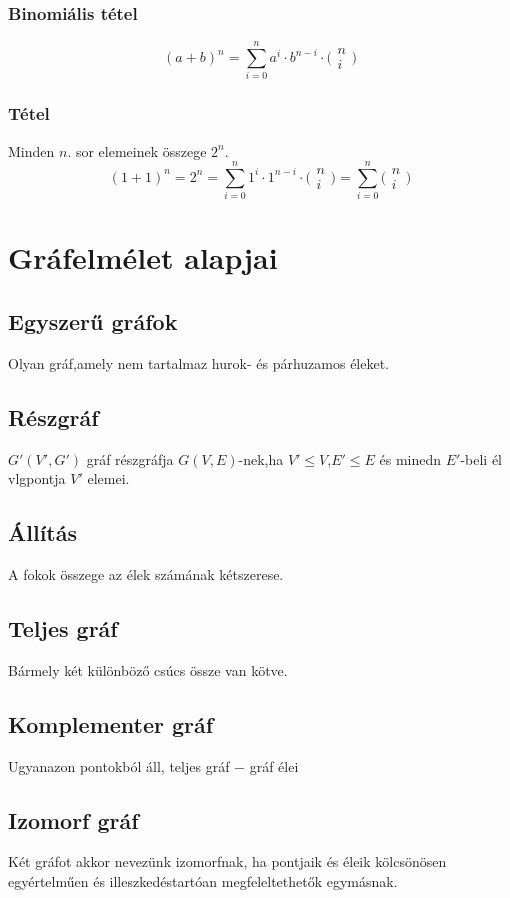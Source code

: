 \documentclass[12pt,a4paper,twoside]{report}
\begin{document}
\subsubsection{Binomiális tétel}
$$(a+b)^n=\sum_{i=0}^{n}a^i\cdot b^{n-i}\cdot\bigl( \begin{smallmatrix*}n\\i\end{smallmatrix*}\bigl)$$
\subsubsection{Tétel}
Minden $n$. sor elemeinek összege $2^n$.
\biz
$$(1+1)^n=2^n=\sum_{i=0}^{n}1^i\cdot 1^{n-i}\cdot\bigl( \begin{smallmatrix*}n\\i\end{smallmatrix*}\bigl)=\sum_{i=0}^{n}\bigl( \begin{smallmatrix*}n\\i\end{smallmatrix*}\bigl)$$
\section{Gráfelmélet alapjai}
\subsection{Egyszerű gráfok}
Olyan gráf,amely nem tartalmaz hurok- és párhuzamos éleket.
\subsection{Részgráf}
$G'(V',G')$ gráf részgráfja $G(V,E)$-nek,ha $V'\leq V$,$E'\leq E$ és minedn $E'$-beli él vlgpontja $V'$ elemei.
\subsection{Állítás}
A fokok összege az élek számának kétszerese.
\subsection{Teljes gráf}
Bármely két különböző csúcs össze van kötve.
\subsection{Komplementer gráf}
Ugyanazon pontokból áll, teljes gráf $-$ gráf élei
\subsection{Izomorf gráf}
Két gráfot akkor nevezünk izomorfnak, ha pontjaik és éleik kölcsönösen egyértelműen és illeszkedéstartóan megfeleltethetők egymásnak.
\end{document}
